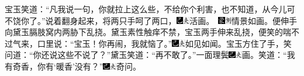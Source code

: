 宝玉笑道：“凡我说一句，你就拉上这么些，不给你个利害，也不知道，从今儿可不饶你了。”说着翻身起来，将两只手呵了两口，{\includegraphics[width=3mm]{../Images/00003}\includegraphics[width=3mm]{../Images/00012}\footnotesize \kaishu 活画。　\includegraphics[width=3mm]{../Images/00006}\includegraphics[width=3mm]{../Images/00011}\footnotesize \kaishu 情景如画。}便伸手向黛玉膈肢窝内两胁下乱挠。黛玉素性触痒不禁，宝玉两手伸来乱挠，便笑的喘不过气来，口里说：“宝玉！你再闹，我就恼了。”{\includegraphics[width=3mm]{../Images/00003}\includegraphics[width=3mm]{../Images/00012}\footnotesize \kaishu 如见如闻。}宝玉方住了手，笑问道：“你还说这些不说了？”黛玉笑道：“再不敢了。”一面理鬓{\includegraphics[width=3mm]{../Images/00003}\includegraphics[width=3mm]{../Images/00012}\footnotesize \kaishu 画。}笑道：“我有奇香，你有‘暖香’没有？”{\includegraphics[width=3mm]{../Images/00003}\includegraphics[width=3mm]{../Images/00012}\footnotesize \kaishu 奇问。}

